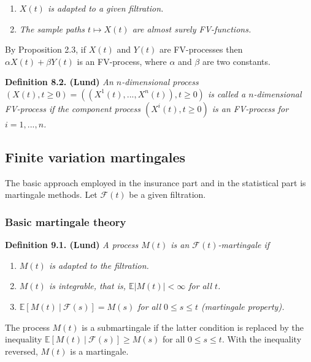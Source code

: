 \documentclass[a4paper,10pt,openany]{book}
\providecommand{\tightlist}{%
 \setlength{\itemsep}{0pt}\setlength{\parskip}{0pt}}
\begin{document}
\begin{enumerate}
\def\labelenumi{(\roman{enumi})}
\tightlist
\item
  \emph{\(X(t)\) is adapted to a given filtration.}
\item
  \emph{The sample paths \(t \mapsto X(t)\) are almost surely FV-functions.}
\end{enumerate}

By Proposition 2.3, if \(X(t)\) and \(Y (t)\) are FV-processes then \(\alpha X(t) + \beta Y (t)\) is an FV-process, where \(\alpha\) and \(\beta\) are two constants.

\textbf{Definition 8.2. (Lund)} \emph{An \(n\)-dimensional process \((X(t), t \ge 0) = ((X^1(t),..., X^n(t)), t \ge 0)\) is called a \(n\)-dimensional FV-process if the component process \((X^i(t),t \ge 0)\) is an FV-process for \(i = 1,...,n\).}

\hypertarget{finite-variation-martingales}{%
\subsection{Finite variation martingales}\label{finite-variation-martingales}}

The basic approach employed in the insurance part and in the statistical part is martingale methods. Let \(\mathcal F(t)\) be a given filtration.

\hypertarget{basic-martingale-theory}{%
\subsubsection{Basic martingale theory}\label{basic-martingale-theory}}

\textbf{Definition 9.1. (Lund)} \emph{A process \(M(t)\) is an \(\mathcal F(t)\)-martingale if}

\begin{enumerate}
\def\labelenumi{(\roman{enumi})}
\tightlist
\item
  \emph{\(M(t)\) is adapted to the filtration.}
\item
  \emph{\(M(t)\) is integrable, that is, \(\mathbb E\vert M(t)\vert<\infty\) for all \(t\).}
\item
  \emph{\(\mathbb E[M(t)\ \vert\ \mathcal F(s)]=M(s)\) for all \(0\le s\le t\) (martingale property).}
\end{enumerate}

The process \(M(t)\) is a submartingale if the latter condition is replaced by the inequality \(\mathbb E[M (t)\ \vert\ \mathcal F (s)] \ge M (s)\) for all \(0 \le s \le t\). With the inequality reversed, \(M (t)\) is a martingale.
\end{document}
